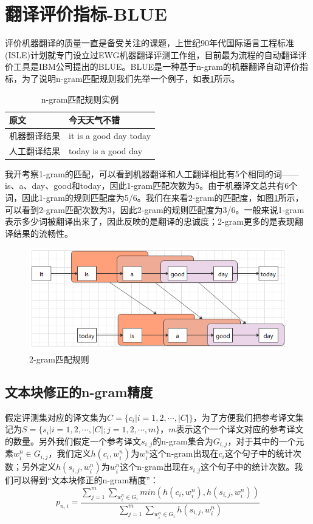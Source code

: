 \documentclass[twoside,a4paper,12pt]{book}%
\begin{document}
\section{翻译评价指标-BLUE}
评价机器翻译的质量一直是备受关注的课题，上世纪90年代国际语言工程标准(ISLE)计划就专门设立过EWG机器翻译评测工作组，目前最为流程的自动翻译评价工具是IBM公司提出的BLUE。BLUE是一种基于n-gram的机器翻译自动评价指标，为了说明n-gram匹配规则我们先举一个例子，如表\ref{tab:n-gram_match}所示。
\begin{table}[h]
	\caption{n-gram匹配规则实例}\label{tab:n-gram_match}  
	\centering
\begin{tabular}{l|l}
	\hline
	\hline
	原文& 今天天气不错 \\
	\hline
	机器翻译结果& it is a good day today \\
	\hline
	人工翻译结果& today is a good day \\
	\hline
\end{tabular}
\end{table}
我开考察1-gram的匹配，可以看到机器翻译和人工翻译相比有5个相同的词——is、a、day、good和today，因此1-gram匹配次数为5。由于机器译文总共有6个词，因此1-gram的规则匹配度为5/6。我们在来看2-gram的匹配度，如图\ref{fig:blue1}所示，可以看到2-gram匹配次数为3，因此2-gram的规则匹配度为3/6。一般来说1-gram表示多少词被翻译出来了，因此反映的是翻译的忠诚度；2-gram更多的是表现翻译结果的流畅性。
\begin{figure}[H]
	\begin{center}
		\includegraphics[width=5.0in]{figures/blue1.png}
		\caption{2-gram匹配规则}
		\label{fig:blue1}
	\end{center}
\end{figure}
\subsection{文本块修正的n-gram精度}
假定评测集对应的译文集为$C=\{c_i|i=1,2,\cdots,|C|\}$，为了方便我们把参考译文集记为$S=\{s_{i}|i=1,2,\cdots,|C|;j=1,2,\cdots,m\}$，$m$表示这个一个译文对应的参考译文的数量。另外我们假定一个参考译文$s_{i,j}$的n-gram集合为$G_{i,j}$，对于其中的一个元素$w_{i}^{n}\in G_{i,j}$，我们定义$h(c_i,w_{i}^{n})$为$w_{i}^{n}$这个n-gram出现在$c_i$这个句子中的统计次数；另外定义$h(s_{i,j},w_{i}^{n})$为$w_{i}^{n}$这个n-gram出现在$s_{i,j}$这个句子中的统计次数。我们可以得到“文本块修正的n-gram精度”：
$$
p_{n,i}=\frac{
	\sum_{j=1}^{m}{
		\sum_{w_i^{n}\in G_i}{
			min(h(c_{i},w_{i}^{n}),h(s_{i,j},w_{i}^{n}))
		}
	}
}{
	\sum_{j=1}^{m}{
		\sum_{w_i^{n}\in G_i}{
			h(s_{i,j},w_{i}^{n})
		}
	}
}
$$
\end{document}
